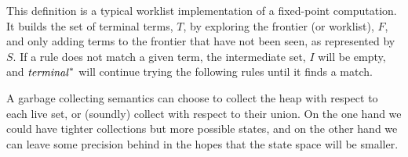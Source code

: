 This definition is a typical worklist implementation of a fixed-point computation.
%
It builds the set of terminal terms, $T$, by exploring the frontier (or worklist), $F$, and only adding terms to the frontier that have not been seen, as represented by $S$.
%
If a rule does not match a given term, the intermediate set, $I$ will be empty, and $\mathit{terminal}^*$ will continue trying the following rules until it finds a match.
%

%
A garbage collecting semantics can choose to collect the heap with respect to each live set, or (soundly) collect with respect to their union.
%
On the one hand we could have tighter collections but more possible states, and on the other hand we can leave some precision behind in the hopes that the state space will be smaller.
%
